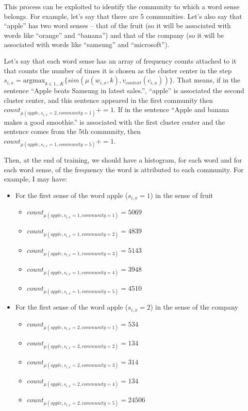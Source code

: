This process can be exploited to identify the community to which a word sense belongs. For example, let's say that there are 5 communities. Let's also say that ``apple'' has two word senses -- that of the fruit (so it will be associated with words like ``orange'' and ``banana'') and that of the company (so it will be associated with words like ``samsung'' and ``microsoft'').

Let's say that each word sense has an array of frequency counts attached to it that counts the number of times it is chosen as the cluster center in the step $s_{i,x} = \mathrm{argmax}_{k\in 1 ... K} \{sim(\mu(w_{i,x}, k), v_{context}(c_{i,x}))\}$. That means, if in the sentence ``Apple beats Samsung in latest sales.'', ``apple'' is associated the second cluster center, and this sentence appeared in the first community then $count_{\mu(apple, s_{i,x} = 2, community = 1)} += 1$. If in the sentence ``Apple and banana makes a good smoothie.'' is associated with the first cluster center and the sentence comes from the 5th community, then $count_{\mu(apple, s_{i,x} = 1, community = 5)} += 1$.

Then, at the end of training, we should have a histogram, for each word and for each word sense, of the frequency the word is attributed to each community. For example, I may have:

\begin{itemize}
\item For the first sense of the word apple ($s_{i,x} = 1$) in the sense of fruit
\begin{itemize}
\item $count_{\mu(apple, s_{i,x}=1, community=1)} = 5069$
\item $count_{\mu(apple, s_{i,x}=1, community=2)} = 4839$
\item $count_{\mu(apple, s_{i,x}=1, community=3)} = 5143$
\item $count_{\mu(apple, s_{i,x}=1, community=4)} = 3948$
\item $count_{\mu(apple, s_{i,x}=1, community=5)} = 4510$
\end{itemize}
\item For the first sense of the word apple ($s_{i,x} = 2$) in the sense of the company
\begin{itemize}
\item $count_{\mu(apple, s_{i,x}=2, community=1)} = 534$
\item $count_{\mu(apple, s_{i,x}=2, community=2)} = 134$
\item $count_{\mu(apple, s_{i,x}=2, community=3)} = 314$
\item $count_{\mu(apple, s_{i,x}=2, community=4)} = 134$
\item $count_{\mu(apple, s_{i,x}=2, community=5)} = 24506$
\end{itemize}
\end{itemize}

